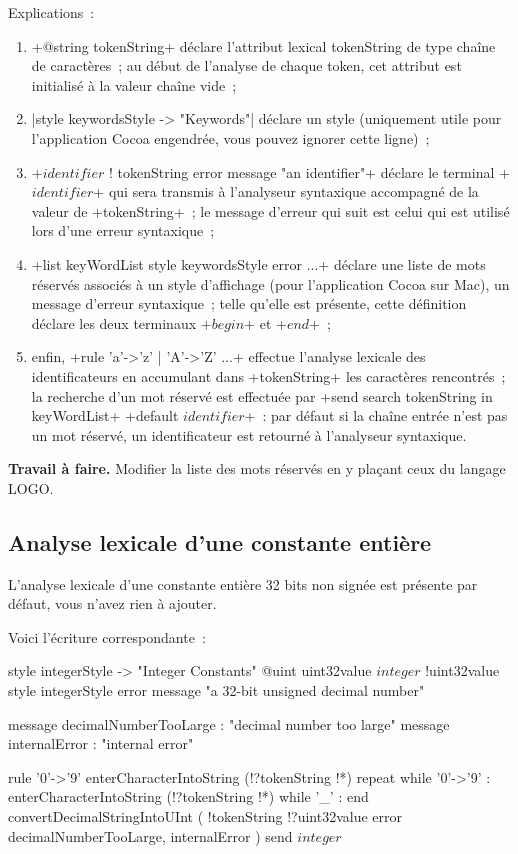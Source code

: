 Explications~:
\begin{enumerate}
  \item \ggs+@string tokenString+ déclare l’attribut lexical tokenString de type chaîne de caractères~; au début de l’analyse de chaque token, cet attribut est initialisé à la valeur chaîne vide~;
  \item \ggs|style keywordsStyle -> "Keywords"| déclare un style (uniquement utile pour l’application Cocoa engendrée, vous pouvez ignorer cette ligne)~;
  \item \ggs+$identifier$ ! tokenString error message "an identifier"+ déclare le terminal \ggs+$identifier$+ qui sera transmis à l’analyseur syntaxique accompagné de la valeur de \ggs+tokenString+~; le message d’erreur qui suit est celui qui est utilisé lors d’une erreur syntaxique~;
  \item \ggs+list keyWordList style keywordsStyle error ...+ déclare une liste de mots réservés associés à un style d’affichage (pour l’application Cocoa sur Mac), un message d’erreur syntaxique~; telle qu’elle est présente, cette définition déclare les deux terminaux \ggs+$begin$+ et \ggs+$end$+~;
  \item enfin, \ggs+rule 'a'->'z' | 'A'->'Z' ...+ effectue l’analyse lexicale des identificateurs en accumulant dans \ggs+tokenString+ les caractères rencontrés~; la recherche d'un mot réservé est effectuée par \ggs+send search tokenString in keyWordList+ \ggs+default $identifier$+~: par défaut si la chaîne entrée n'est pas un mot réservé, un identificateur est retourné à l’analyseur syntaxique.
\end{enumerate}

\textbf{Travail à faire.} Modifier la liste des mots réservés en y plaçant ceux du langage LOGO.

\subsection{Analyse lexicale d'une constante entière}

L’analyse lexicale d’une constante entière 32 bits non signée est présente par défaut, vous n’avez rien à ajouter.

Voici l'écriture correspondante~:
\begin{galgas}
style integerStyle -> "Integer Constants"
@uint uint32value
$integer$ !uint32value style integerStyle
               error message "a 32-bit unsigned decimal number"

message decimalNumberTooLarge : "decimal number too large"
message internalError : "internal error"

rule '0'->'9' {
  enterCharacterIntoString (!?tokenString !*)
  repeat
  while '0'->'9' :
    enterCharacterIntoString (!?tokenString !*)
  while '_' :
  end
  convertDecimalStringIntoUInt (
    !tokenString
    !?uint32value
    error decimalNumberTooLarge, internalError
  )
  send $integer$
}
\end{galgas}


